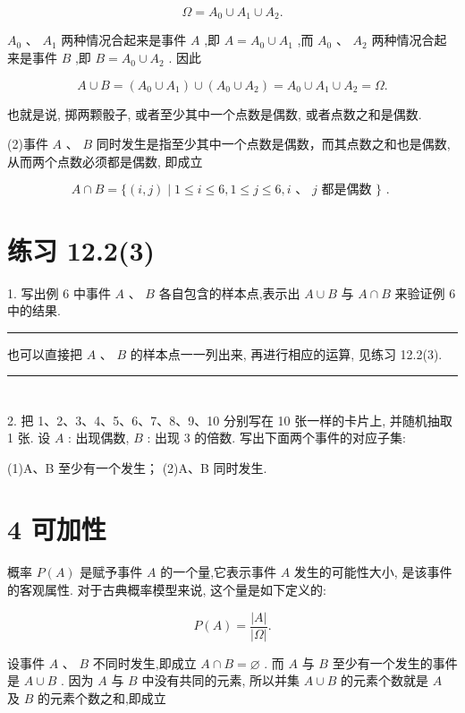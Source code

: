 \documentclass[10pt]{article}
\newcommand{\HRule}{\begin{center}\rule{0.9\linewidth}{0.2mm}\end{center}}
\begin{document}
\[
\Omega  = {A}_{0} \cup  {A}_{1} \cup  {A}_{2}.
\]

\({A}_{0}\text{ 、 }{A}_{1}\) 两种情况合起来是事件 \(A\) ,即 \(A = {A}_{0} \cup  {A}_{1}\) ,而 \({A}_{0}\text{ 、 }{A}_{2}\) 两种情况合起来是事件 \(B\) ,即 \(B = {A}_{0} \cup  {A}_{2}\) . 因此

\[
A \cup  B = \left( {{A}_{0} \cup  {A}_{1}}\right)  \cup  \left( {{A}_{0} \cup  {A}_{2}}\right)  = {A}_{0} \cup  {A}_{1} \cup  {A}_{2} = \Omega .
\]

也就是说, 掷两颗骰子, 或者至少其中一个点数是偶数, 或者点数之和是偶数.

(2)事件 \(A\) 、 \(B\) 同时发生是指至少其中一个点数是偶数，而其点数之和也是偶数, 从而两个点数必须都是偶数, 即成立

\[
A \cap  B = \{ \left( {i,j}\right)  \mid  1 \leq  i \leq  6,1 \leq  j \leq  6,i\text{ 、 }j\text{ 都是偶数 }\} \text{ . }
\]

\section*{练习 12.2(3)}

1. 写出例 6 中事件 \(A\text{ 、 }B\) 各自包含的样本点,表示出 \(A \cup  B\) 与 \(A \cap  B\) 来验证例 6 中的结果.

\HRule

也可以直接把 \(A\) 、 \(B\) 的样本点一一列出来, 再进行相应的运算, 见练习 12.2(3).

\HRule

\section*{}

2. 把 1、2、3、4、5、6、7、8、9、10 分别写在 10 张一样的卡片上, 并随机抽取 1 张. 设 \(A\) : 出现偶数, \(B\) : 出现 3 的倍数. 写出下面两个事件的对应子集:

(1)A、B 至少有一个发生； (2)A、B 同时发生.

\section*{4 可加性}

概率 \(P\left( A\right)\) 是赋予事件 \(A\) 的一个量,它表示事件 \(A\) 发生的可能性大小, 是该事件的客观属性. 对于古典概率模型来说, 这个量是如下定义的:

\[
P\left( A\right)  = \frac{\left| A\right| }{\left| \Omega \right| }.
\]

设事件 \(A\text{ 、 }B\) 不同时发生,即成立 \(A \cap  B = \varnothing\) . 而 \(A\) 与 \(B\) 至少有一个发生的事件是 \(A \cup  B\) . 因为 \(A\) 与 \(B\) 中没有共同的元素, 所以并集 \(A \cup  B\) 的元素个数就是 \(A\) 及 \(B\) 的元素个数之和,即成立
\end{document}
